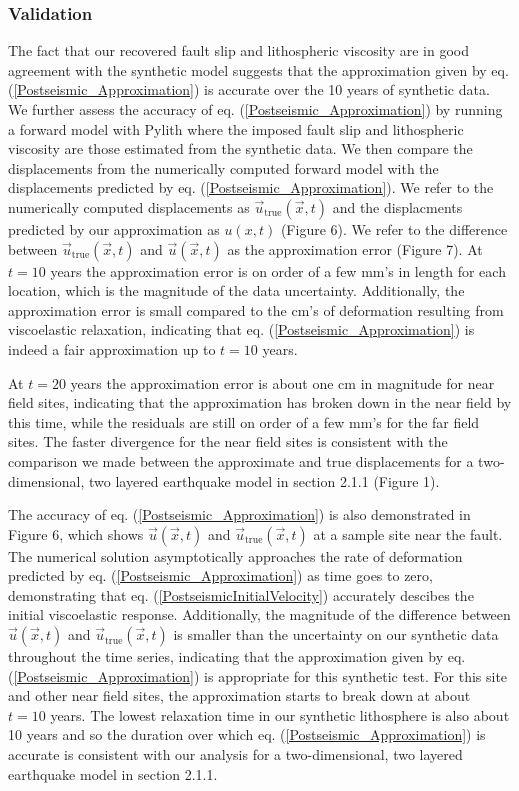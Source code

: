 \documentclass[extra,mreferee]{gji}
\begin{document}
\subsubsection{Validation}
The fact that our recovered fault slip and lithospheric viscosity are
in good agreement with the synthetic model suggests that the
approximation given by eq. (\ref{Postseismic_Approximation}) is
accurate over the 10 years of synthetic data.  We further assess the accuracy
of eq. (\ref{Postseismic_Approximation}) by running a forward model
with Pylith where the imposed fault slip and lithospheric viscosity
are those estimated from the synthetic data.  We then compare the
displacements from the numerically computed forward model with the
displacements predicted by eq. (\ref{Postseismic_Approximation}).  We
refer to the numerically computed displacements as
$\vec{u}_{\mathrm{true}}(\vec{x},t)$ and the displacments predicted by our
approximation as $u(x,t)$ (Figure 6).  We refer to the
difference between $\vec{u}_{\mathrm{true}}(\vec{x},t)$ and $\vec{u}(\vec{x},t)$
as the approximation error (Figure 7). At $t=10$ years the
approximation error is on order of a few mm's in length for each
location, which is the magnitude of the data uncertainty.
Additionally, the approximation error is small compared to the
cm's of deformation resulting from viscoelastic relaxation, indicating
that eq. (\ref{Postseismic_Approximation}) is indeed a fair
approximation up to $t=10$ years.  

At $t=20$ years the approximation error is about
one cm in magnitude for near field sites, indicating that the
approximation has broken down in the near field by this time, while
the residuals are still on order of a few mm's for the far field
sites.  The faster divergence for the near field sites is consistent
with the comparison we made between the approximate and true
displacements for a two-dimensional, two layered earthquake model in
section 2.1.1 (Figure 1).

The accuracy of eq. (\ref{Postseismic_Approximation}) is also
demonstrated in Figure 6, which shows $\vec{u}(\vec{x},t)$ and
$\vec{u}_{\mathrm{true}}(\vec{x},t)$ at a sample site near the fault.  The
numerical solution asymptotically approaches the rate of deformation
predicted by eq. (\ref{Postseismic_Approximation}) as time goes to
zero, demonstrating that eq. (\ref{PostseismicInitialVelocity})
accurately descibes the initial viscoelastic response.  Additionally,
the magnitude of the difference between $\vec{u}(\vec{x},t)$ and
$\vec{u}_{\mathrm{true}}(\vec{x},t)$ is smaller than the uncertainty on our
synthetic data throughout the time series, indicating that the
approximation given by eq. (\ref{Postseismic_Approximation}) is
appropriate for this synthetic test.  For this site and other near
field sites, the approximation starts to break down at about $t=10$
years. The lowest relaxation time in our synthetic lithosphere is also
about 10 years and so the duration over which
eq. (\ref{Postseismic_Approximation}) is accurate is consistent with
our analysis for a two-dimensional, two layered earthquake model in
section 2.1.1.
\end{document}
